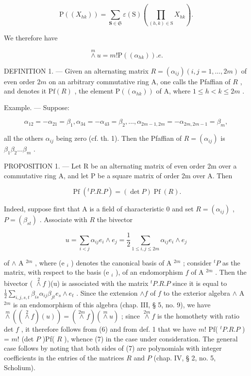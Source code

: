 \[
\mathrm{P} ((X _ {h k})) = \sum_ {\mathbf {S} \in \mathfrak {S}} \varepsilon (\mathrm{S}) (\prod_ {(h, k) \in \mathrm{S}} X _ {h k}).\tag{5}
\]

We therefore have

\[
\stackrel {m} {\wedge} u = m! \mathrm{P} ((\alpha_ {h k})). e.\tag{6}
\]

DEFINITION 1. --- Given an alternating matrix \(R = (\alpha_{ij}) (i, j = 1, \ldots, 2m)\) of even order \(2m\) on an arbitrary commutative ring A, one calls the Pfaffian of \(R\) , and denotes it \(\mathrm{Pf}(R)\) , the element \(\mathrm{P}((\alpha_{hk}))\) of A, where \(1 \leqslant h < k \leqslant 2m\) .

Example. --- Suppose:

\[
\alpha_ {1 2} = - \alpha_ {2 1} = \beta_ {1}, \alpha_ {3 4} = - \alpha_ {4 3} = \beta_ {2}, \dots , \alpha_ {2 m - 1, 2 m} = - \alpha_ {2 m, 2 m - 1} = \beta_ {m},
\]

all the others \(\alpha_{ij}\) being zero (cf. th. 1). Then the Pfaffian of \(R = (\alpha_{ij})\) is \(\beta_1\beta_2\ldots\beta_m\) .

PROPOSITION 1. --- Let R be an alternating matrix of even order 2m over a commutative ring A, and let P be a square matrix of order 2m over A. Then

\[
\operatorname{Pf} (^ {t} P. R. P) = (\det P) \operatorname{Pf} (R).\tag{7}
\]

Indeed, suppose first that A is a field of characteristic 0 and set \(R = (\alpha_{ij})\) , \(P = (\beta_{st})\) . Associate with \(R\) the bivector

\[
u = \sum_ {i <   j} \alpha_ {i j} e _ {i} \wedge e _ {j} = \frac {1}{2} \sum_ {1 \leqslant i, j \leqslant 2 m} \alpha_ {i j} e _ {i} \wedge e _ {j}
\]

of \(\wedge\) A \(^{2m}\) , where (e \(_i\) ) denotes the canonical basis of A \(^{2m}\) ; consider \(^t P\) as the matrix, with respect to the basis (e \(_i\) ), of an endomorphism \(f\) of A \(^{2m}\) . Then the bivector ( \(\overset{2}{\wedge} f\) )(u) is associated with the matrix \(^t P.R.P\) since it is equal to \(\frac{1}{2}\sum_{i,j,s,t}\beta_{is}\alpha_{ij}\beta_{jt}e_s\wedge e_t\) . Since the extension \(\wedge f\) of \(f\) to the exterior algebra \(\wedge\) A \(^{2m}\) is an endomorphism of this algebra (chap. III, § 5, no. 9), we have \(\overset{m}{\wedge}((\overset{2}{\wedge}f)(u)) = (\overset{2m}{\wedge}f)(\overset{m}{\wedge}u)\) ; since \(\overset{2m}{\wedge} f\) is the homothety with ratio det \(f\) , it therefore follows from (6) and from def. 1 that we have \(m!\) Pf( \(^t P.R.P\) ) = \(m!\) (det \(P\) )Pf( \(R\) ), whence (7) in the case under consideration. The general case follows by noting that both sides of (7) are polynomials with integer coefficients in the entries of the matrices \(R\) and \(P\) (chap. IV, § 2, no. 5, Scholium).

